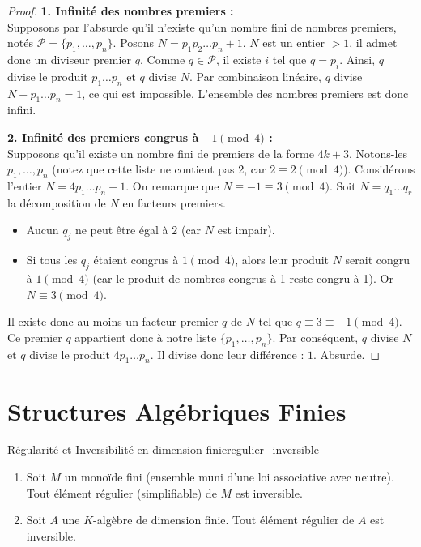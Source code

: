 \documentclass{prepacours}
\begin{document}
\begin{proof}
    \textbf{1. Infinité des nombres premiers :} \\
    Supposons par l'absurde qu'il n'existe qu'un nombre fini de nombres premiers, notés $\mathcal{P} = \{p_1, \dots, p_n\}$.
    Posons $N = p_1 p_2 \dots p_n + 1$.
    $N$ est un entier $>1$, il admet donc un diviseur premier $q$.
    Comme $q \in \mathcal{P}$, il existe $i$ tel que $q = p_i$.
    Ainsi, $q$ divise le produit $p_1 \dots p_n$ et $q$ divise $N$. Par combinaison linéaire, $q$ divise $N - p_1 \dots p_n = 1$, ce qui est impossible.
    L'ensemble des nombres premiers est donc infini.

    \vspace{0.5em}
    \textbf{2. Infinité des premiers congrus à $-1 \pmod 4$ :} \\
    Supposons qu'il existe un nombre fini de premiers de la forme $4k+3$. Notons-les $p_1, \dots, p_n$ (notez que cette liste ne contient pas 2, car $2 \equiv 2 \pmod 4$).
    Considérons l'entier $N = 4 p_1 \dots p_n - 1$.
    On remarque que $N \equiv -1 \equiv 3 \pmod 4$.
    Soit $N = q_1 \dots q_r$ la décomposition de $N$ en facteurs premiers.
    \begin{itemize}
        \item Aucun $q_j$ ne peut être égal à $2$ (car $N$ est impair).
        \item Si tous les $q_j$ étaient congrus à $1 \pmod 4$, alors leur produit $N$ serait congru à $1 \pmod 4$ (car le produit de nombres congrus à 1 reste congru à 1). Or $N \equiv 3 \pmod 4$.
    \end{itemize}
    Il existe donc au moins un facteur premier $q$ de $N$ tel que $q \equiv 3 \equiv -1 \pmod 4$.
    Ce premier $q$ appartient donc à notre liste $\{p_1, \dots, p_n\}$.
    Par conséquent, $q$ divise $N$ et $q$ divise le produit $4 p_1 \dots p_n$.
    Il divise donc leur différence : $1$. Absurde.
\end{proof}

\section{Structures Algébriques Finies}

\begin{proposition}{Régularité et Inversibilité en dimension finie}{regulier_inversible}
    \begin{enumerate}
        \item Soit $M$ un monoïde fini (ensemble muni d'une loi associative avec neutre). Tout élément régulier (simplifiable) de $M$ est inversible.
        \item Soit $A$ une $K$-algèbre de dimension finie. Tout élément régulier de $A$ est inversible.
    \end{enumerate}
\end{proposition}
\end{document}
